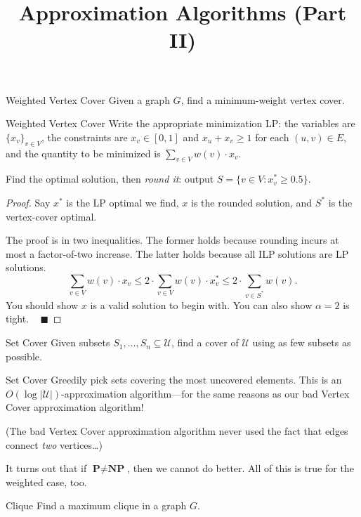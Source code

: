 \title{Approximation Algorithms (Part II)}



\begin{problem}{Weighted Vertex Cover}
    Given a graph $G$, find a minimum-weight vertex cover.
\end{problem}

\begin{solution}{Weighted Vertex Cover}
    Write the appropriate minimization LP: the variables are $\{x_v\}_{v \in V}$, the constraints are $x_v \in [0, 1]$ and $x_u + x_v \geq 1$ for each $(u, v) \in E$, and the quantity to be minimized is $\sum_{v \in V} w(v) \cdot x_v$.

    Find the optimal solution, then \emph{round it}: output $S = \{v \in V: x_v^* \geq 0.5\}$.
\end{solution}

\begin{proof}
    Say $x^*$ is the LP optimal we find, $x$ is the rounded solution, and $S^*$ is the vertex-cover optimal.

    The proof is in two inequalities.  The former holds because rounding incurs at most a factor-of-two increase.  The latter holds because all ILP solutions are LP solutions.
    \[ \sum_{v \in V} w(v) \cdot x_v \leq 2 \cdot \sum_{v \in V} w(v) \cdot x_v^* \leq 2 \cdot \sum_{v \in S^*} w(v). \]
    You should show $x$ is a valid solution to begin with.  You can also show $\alpha = 2$ is tight. ~ $\blacksquare$
\end{proof}

\begin{problem}{Set Cover}
    Given subsets $S_1, \dots, S_n \subseteq \mathcal{U}$, find a cover of $\mathcal{U}$ using as few subsets as possible.
\end{problem}

\begin{solution}{Set Cover}
    Greedily pick sets covering the most uncovered elements.  This is an $O(\log |\mathcal{U}|)$-approximation algorithm---for the same reasons as our bad Vertex Cover approximation algorithm!

    (The bad Vertex Cover approximation algorithm never used the fact that edges connect \emph{two} vertices\dots)
\end{solution}

It turns out that if $\textbf{P} \neq \textbf{NP}$, then we cannot do better.  All of this is true for the weighted case, too.

\begin{problem}{Clique}
    Find a maximum clique in a graph $G$.
\end{problem}

